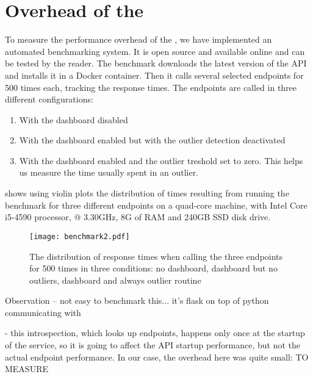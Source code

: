   
\newpage
\section{Overhead of the \tool}
\label{sec:overhead}

To measure the performance overhead of the \tool, we have implemented an automated benchmarking system. It is open source and available online and can be tested by the reader. The benchmark downloads the latest version of the \zee API and installs it in a Docker container. Then it calls several selected endpoints for 500 times each, tracking the response times. The endpoints are called in three different configurations: 

	\begin{enumerate}
		\item With the dashboard disabled
		\item With the dashboard enabled but with the outlier detection deactivated
		\item With the dashboard enabled and the outlier treshold set to zero. This helps us measure the time usually spent in an outlier.
	\end{enumerate}



 shows using violin plots the distribution of times resulting from running the benchmark for three different endpoints on a quad-core machine, with Intel Core i5-4590 processor, @ 3.30GHz, 8G of RAM and 240GB SSD disk drive.


\begin{figure}[h!]
	\centering
	\texttt{[image: benchmark2.pdf]}
	\caption{The distribution of response times when calling the three endpoints for 500 times in three conditions: no dashboard, dashboard but no outliers, dashboard and always outlier routine}
	\label{fig:bench}
\end{figure}





Observation -- not easy to benchmark this... it's flask on top of python communicating with 

- this introspection, which looks up endpoints, happens only once at the startup of the service, so it is going to affect the API startup performance, but not the actual endpoint performance. In our case, the overhead here was quite small: TO MEASURE


  